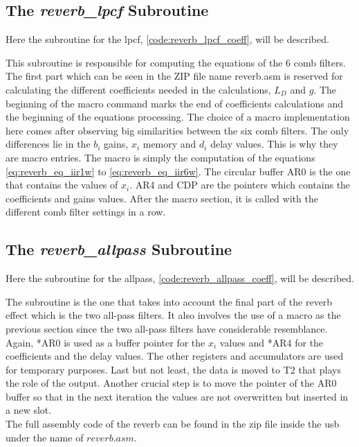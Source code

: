 \subsection{The \textit{reverb_lpcf} Subroutine}
Here the subroutine for the \gls{lpcf}, \autoref{code:reverb_lpcf_coeff}, will be described.


This subroutine is responsible for computing the equations of the 6 comb filters. The first part which can be seen in the ZIP file name reverb.asm is reserved for calculating the different coefficients needed in the calculations, $L_D$ and $g$. The beginning of the macro command marks the end of coefficients calculations and the beginning of the equations processing. The choice of a macro implementation here comes after observing big similarities between the six comb filters. The only differences lie in the $b_{i}$ gains, $x_{i}$ memory and $d_{i}$ delay values. This is why they are macro entries. The macro is simply the computation of the equations \ref{eq:reverb_eq_iir1w} to \ref{eq:reverb_eq_iir6w}. The circular buffer AR0 is the one that contains the values of $x_{i}$. AR4 and CDP are the pointers which contains the coefficients and gains values.
After the macro section, it is called with the different comb filter settings in a row. 

\subsection{The \textit{reverb_allpass} Subroutine} \label{imp:reverb_allpass}
Here the subroutine for the allpass, \autoref{code:reverb_allpass_coeff}, will be described.

The subroutine is the one that takes into account the final part of the \gls{reverb} effect which is the two all-pass filters. It also involves the use of a macro as the previous section since the two all-pass filters have considerable resemblance. Again, *AR0 is used as a buffer pointer for the $x_{i}$ values and *AR4 for the coefficients and the delay values. The other registers and accumulators are used for temporary purposes.
Last but not least, the data is moved to T2 that plays the role of the output. 
Another crucial step is to move the pointer of the AR0 buffer so that in the next iteration the values are not overwritten but inserted in a new slot.\\
The full assembly code of the reverb can be found in the zip file inside the usb under the name of $reverb.asm$. 

